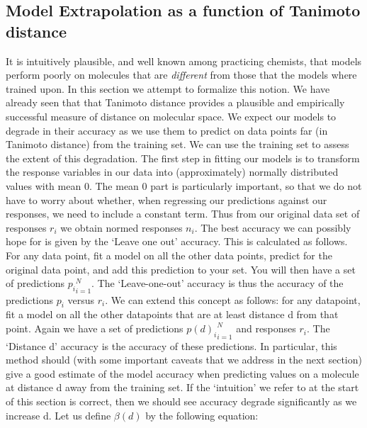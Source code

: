 \documentclass{article}
\begin{document}
\subsection{Model Extrapolation as a function of Tanimoto distance}
It is intuitively plausible, and well known among practicing chemists, that models perform poorly on molecules that are \textit{different} from those that the models where trained upon\cite{et0:}.  In this section we attempt to formalize this notion.  We have already seen that that Tanimoto distance provides a plausible and empirically successful measure of distance on molecular space.
\newline
\newline
We expect our models to degrade in their accuracy as we use them to predict on data points far (in Tanimoto distance) from the training set. We can use the training set to assess the extent of this degradation.
\newline
\newline
The first step in fitting our models is to transform the response variables in our data into (approximately) normally distributed values with mean 0. The mean 0 part is particularly important, so that we do not have to worry about whether, when regressing our predictions against our responses, we need to include a constant term.  Thus from our original data set of responses $r_i$ we obtain normed responses $n_i$.
\newline
\newline
The best accuracy we can possibly hope for is given by the `Leave one out' accuracy.  This is calculated as follows.  For any data point, fit a model on all the other data points, predict for the original data point, and add this prediction to your set.  You will then have a set of predictions ${ p_i }_{i = 1}^N$. The `Leave-one-out' accuracy is thus the accuracy of the predictions $p_i$ versus $r_i$.
\newline
\newline
We can extend this concept as follows:  for any datapoint, fit a model on all the other datapoints that are at least distance d from that point.  Again we have a set of predictions ${ p(d)_i }_{i = 1}^N$ and responses $r_i$.  The `Distance d' accuracy is the accuracy of these predictions.  In particular, this method should (with some important caveats that we address in the next section) give a good estimate of the model accuracy when predicting values on a molecule at distance d away from the training set.  If the `intuition' we refer to at the start of this section is correct, then we should see accuracy degrade significantly as we increase d.
\newline
\newline
Let us define $\beta(d)$ by the following equation:
\end{document}

